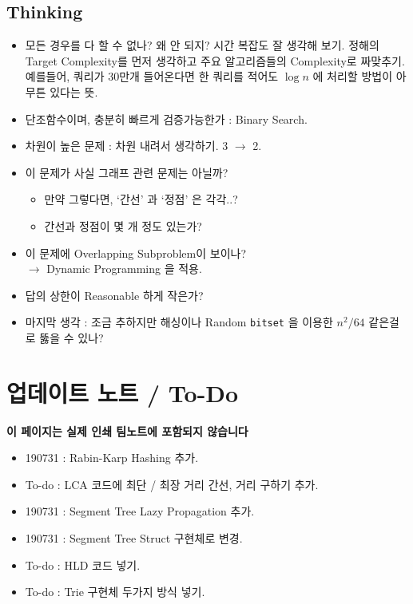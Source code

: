\documentclass[landscape,8pt]{article}
\begin{document}
\begin{multicols}{2}
  \subsection{Thinking}
    \begin{itemize}
      \item 모든 경우를 다 할 수 없나? 왜 안 되지? 시간 복잡도 잘 생각해 보기. 정해의 Target Complexity를 먼저 생각하고 주요 알고리즘들의 Complexity로 짜맞추기.\\
      예를들어, 쿼리가 30만개 들어온다면 한 쿼리를 적어도 $\log{n}$ 에 처리할 방법이 아무튼 있다는 뜻.
      \item 단조함수이며, 충분히 빠르게 검증가능한가 : Binary Search.
      \item 차원이 높은 문제 : 차원 내려서 생각하기. 3 $\rightarrow$ 2.
      \item 이 문제가 사실 그래프 관련 문제는 아닐까?
        \begin{itemize}
          \item 만약 그렇다면, `간선' 과 `정점' 은 각각..?
          \item 간선과 정점이 몇 개 정도 있는가?
        \end{itemize}
      \item 이 문제에 Overlapping Subproblem이 보이나? \\$\rightarrow$ Dynamic Programming 을 적용.
      \item 답의 상한이 Reasonable 하게 작은가?
      \item 마지막 생각 : 조금 추하지만 해싱이나 Random \texttt{bitset} 을 이용한 $n^2 / 64$ 같은걸로 뚫을 수 있나?
    \end{itemize}
\newpage
\section*{업데이트 노트 / To-Do}
\textbf{이 페이지는 실제 인쇄 팀노트에 포함되지 않습니다}
\begin{itemize}
  \item 190731 : Rabin-Karp Hashing 추가.
  \item To-do : LCA 코드에 최단 / 최장 거리 간선, 거리 구하기 추가.
  \item 190731 : Segment Tree Lazy Propagation 추가.
  \item 190731 : Segment Tree Struct 구현체로 변경.
  \item To-do : HLD 코드 넣기.
  \item To-do : Trie 구현체 두가지 방식 넣기.
\columnbreak
\end{itemize}
\end{multicols}
\end{document}
